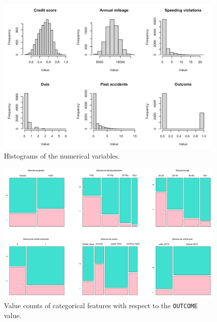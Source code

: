 \documentclass[a4paper,11pt, titlepage]{article}
\begin{document}
\begin{figure}[!h]
    \centering
    \includegraphics[scale=0.35]{eda.png}
    \caption{Histograms of the numerical variables.}
    \label{fig:histograms}
\end{figure}


\begin{figure}[!h]
    \centering
    \includegraphics[scale=0.3]{eda-report.png}
    \caption{Value counts of categorical features with respect to the {\tt OUTCOME} value.}
    \label{fig:categorical-counts}
\end{figure}
\end{document}
